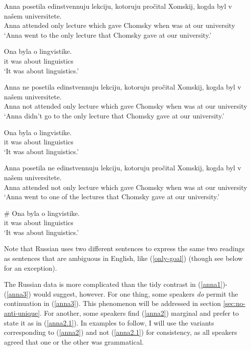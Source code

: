 \begin{exe}
	\ex \label{anna1} \begin{xlist}
		\ex \gll Anna posetila edinstvennuju lekciju, kotoruju pro\v{c}ital Xomskij, kogda byl v na\v{s}em universitete.\\
		Anna attended only lecture which gave Chomsky when was at our university\\
		\glt `Anna went to the only lecture that Chomsky gave at our university.'

		\ex \gll Ona byla o lingvistike.\\
		it was about linguistics\\
		\glt `It was about linguistics.'
	\end{xlist}

	\ex \label{anna2} \begin{xlist}
		\ex \gll Anna ne posetila edinstvennuju lekciju, kotoruju pro\v{c}ital Xomskij, kogda byl v na\v{s}em universitete.\\
		Anna not attended only lecture which gave Chomsky when was at our university\\
		\glt `Anna didn't go to the only lecture that Chomsky gave at our university.'

		\ex \gll Ona byla o lingvistike.\\
		it was about linguistics\\
		\glt `It was about linguistics.'
	\end{xlist}

	\ex \label{anna3} \begin{xlist}
		\ex \gll Anna posetila ne edinstvennuju lekciju, kotoruju pro\v{c}ital Xomskij, kogda byl v na\v{s}em universitete.\\
		Anna attended not only lecture which gave Chomsky when was at our university\\
		\glt `Anna went to one of the lectures that Chomsky gave at our university.'

		\ex \gll \# Ona byla o lingvistike.\\
		{} it was about linguistics\\
		\glt `It was about linguistics.'
	\end{xlist}
\end{exe}

Note that Russian uses two different sentences to express the same two readings as sentences that are ambiguous in English, like (\ref{only-goal}) (though see below for an exception).

The Russian data is more complicated than the tidy contrast in (\ref{anna1})-(\ref{anna3}) would suggest, however. For one thing, some speakers \textit{do} permit the continuation in (\ref{anna3}). This phenomenon will be addressed in section \ref{sec:no-anti-unique}. For another, some speakers find (\ref{anna2}) marginal and prefer to state it as in (\ref{anna2.1}). In examples to follow, I will use the variants corresponding to (\ref{anna2}) and not (\ref{anna2.1}) for consistency, as all speakers agreed that one or the other was grammatical.

